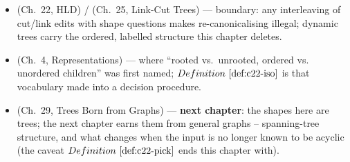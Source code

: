 \begin{itemize}[nosep, leftmargin=1.4em]
        the shape toolkit; the Summit borrows only centroid \emph{existence}, not the
        decomposition.
  \item {} (Ch.~22, HLD) /  (Ch.~25, Link-Cut Trees) --- boundary: any
        interleaving of cut/link edits with shape questions makes re-canonicalising illegal;
        dynamic trees carry the ordered, labelled structure this chapter deletes.
  \item {} (Ch.~4, Representations) --- where ``rooted vs.\ unrooted, ordered vs.
        unordered children'' was first named; \(\defref{c22-iso}\) is that vocabulary made
        into a decision procedure.
  \item {} (Ch.~29, Trees Born from Graphs) --- \textbf{next chapter}: the shapes
        here are trees; the next chapter earns them from general graphs -- spanning-tree
        structure, and what changes when the input is no longer known to be acyclic (the
        caveat \(\defref{c22-pick}\) ends this chapter with).
\end{itemize}

